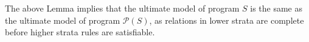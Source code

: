 
The above Lemma implies that the ultimate model of \plang program $S$ is the same as the ultimate model of \lang program $\mathcal{P}(S)$, as relations in lower strata are complete before higher strata rules are satisfiable.





%
%

